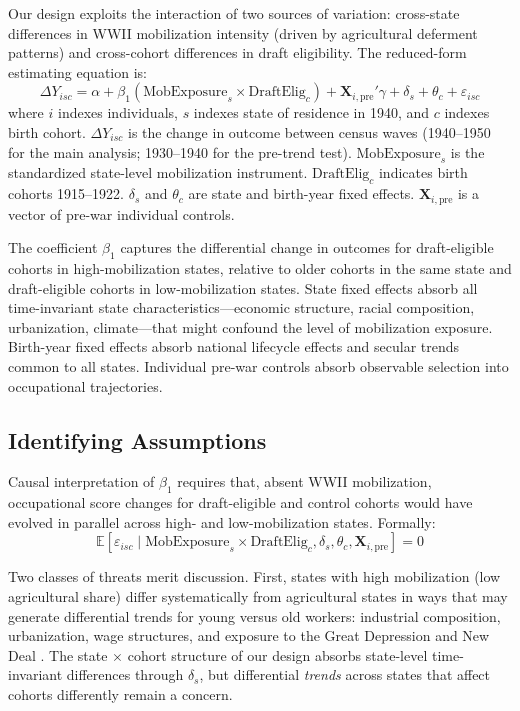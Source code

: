 \documentclass[12pt]{article}
\newcommand{\E}{\mathbb{E}}
\begin{document}
Our design exploits the interaction of two sources of variation: cross-state differences in WWII mobilization intensity (driven by agricultural deferment patterns) and cross-cohort differences in draft eligibility. The reduced-form estimating equation is:
\begin{equation}
\Delta Y_{isc} = \alpha + \beta_1 (\text{MobExposure}_s \times \text{DraftElig}_c) + \mathbf{X}_{i,\text{pre}}' \gamma + \delta_s + \theta_c + \varepsilon_{isc}
\label{eq:main}
\end{equation}
where $i$ indexes individuals, $s$ indexes state of residence in 1940, and $c$ indexes birth cohort. $\Delta Y_{isc}$ is the change in outcome between census waves (1940--1950 for the main analysis; 1930--1940 for the pre-trend test). $\text{MobExposure}_s$ is the standardized state-level mobilization instrument. $\text{DraftElig}_c$ indicates birth cohorts 1915--1922. $\delta_s$ and $\theta_c$ are state and birth-year fixed effects. $\mathbf{X}_{i,\text{pre}}$ is a vector of pre-war individual controls.

The coefficient $\beta_1$ captures the differential change in outcomes for draft-eligible cohorts in high-mobilization states, relative to older cohorts in the same state and draft-eligible cohorts in low-mobilization states. State fixed effects absorb all time-invariant state characteristics---economic structure, racial composition, urbanization, climate---that might confound the level of mobilization exposure. Birth-year fixed effects absorb national lifecycle effects and secular trends common to all states. Individual pre-war controls absorb observable selection into occupational trajectories.

\subsection{Identifying Assumptions}

Causal interpretation of $\beta_1$ requires that, absent WWII mobilization, occupational score changes for draft-eligible and control cohorts would have evolved in parallel across high- and low-mobilization states. Formally:
\begin{equation}
\E[\varepsilon_{isc} \mid \text{MobExposure}_s \times \text{DraftElig}_c, \delta_s, \theta_c, \mathbf{X}_{i,\text{pre}}] = 0
\end{equation}

Two classes of threats merit discussion. First, states with high mobilization (low agricultural share) differ systematically from agricultural states in ways that may generate differential trends for young versus old workers: industrial composition, urbanization, wage structures, and exposure to the Great Depression and New Deal \citep{margo1993, fishback2007}. The state $\times$ cohort structure of our design absorbs state-level time-invariant differences through $\delta_s$, but differential \textit{trends} across states that affect cohorts differently remain a concern.
\end{document}
